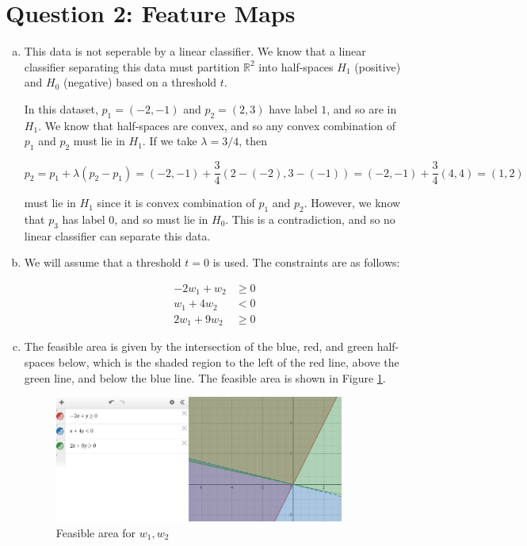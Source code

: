 \documentclass{article}
\newcommand{\R}{\mathbb{R}}
\begin{document}
\section*{Question 2: Feature Maps}

\begin{enumerate}[(a)]
    \item This data is not seperable by a linear classifier. We know that a linear classifier separating this data must partition $\R^2$ into half-spaces $H_1$ (positive) and $H_0$ (negative) based on a threshold $t$. 
    
    In this dataset, $p_1 = (-2, -1)$ and $p_2 = (2, 3)$ have label $1$, and so are in $H_1$. We know that half-spaces are convex, and so any convex combination of $p_1$ and $p_2$ must lie in $H_1$. If we take $\lambda = 3/4$, then 

    \[p_2 = p_1 + \lambda(p_2 - p_1) = (-2, -1) + \frac{3}{4}(2 - (-2), 3 - (-1)) = (-2, -1) + \frac{3}{4}(4, 4) = (1, 2)\]

    must lie in $H_1$ since it is convex combination of $p_1$ and $p_2$. However, we know that $p_3$ has label $0$, and so must lie in $H_0$. This is a contradiction, and so no linear classifier can separate this data.
    \item We will assume that a threshold $t = 0$ is used. The constraints are as follows:
    
    \begin{align}
        -2w_1 + w_2 &\geq 0\\
        w_1 + 4 w_2 &< 0\\
        2w_1 + 9w_2 &\geq 0
    \end{align}
    \item The feasible area is given by the intersection of the blue, red, and green half-spaces below, which is the shaded region to the left of the red line, above the green line, and below the blue line. The feasible area is shown in Figure \ref{fig:q2c}.
    
    \begin{figure}[H]
        \centering
        \includegraphics[width=0.9\textwidth]{../figures/q2_c_feasible_area.png}
        \caption{Feasible area for $w_1, w_2$}
        \label{fig:q2c}
    \end{figure}
\end{enumerate}
\end{document}
